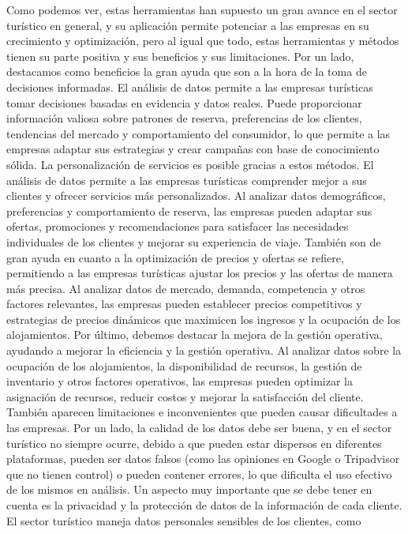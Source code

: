 \documentclass[
  letterpaper,
  DIV=11,
  numbers=noendperiod]{scrreprt}
\begin{document}
Como podemos ver, estas herramientas han supuesto un gran avance en el
sector turístico en general, y su aplicación permite potenciar a las
empresas en su crecimiento y optimización, pero al igual que todo, estas
herramientas y métodos tienen su parte positiva y sus beneficios y sus
limitaciones. Por un lado, destacamos como beneficios la gran ayuda que
son a la hora de la toma de decisiones informadas. El análisis de datos
permite a las empresas turísticas tomar decisiones basadas en evidencia
y datos reales. Puede proporcionar información valiosa sobre patrones de
reserva, preferencias de los clientes, tendencias del mercado y
comportamiento del consumidor, lo que permite a las empresas adaptar sus
estrategias y crear campañas con base de conocimiento sólida. La
personalización de servicios es posible gracias a estos métodos. El
análisis de datos permite a las empresas turísticas comprender mejor a
sus clientes y ofrecer servicios más personalizados. Al analizar datos
demográficos, preferencias y comportamiento de reserva, las empresas
pueden adaptar sus ofertas, promociones y recomendaciones para
satisfacer las necesidades individuales de los clientes y mejorar su
experiencia de viaje. También son de gran ayuda en cuanto a la
optimización de precios y ofertas se refiere, permitiendo a las empresas
turísticas ajustar los precios y las ofertas de manera más precisa. Al
analizar datos de mercado, demanda, competencia y otros factores
relevantes, las empresas pueden establecer precios competitivos y
estrategias de precios dinámicos que maximicen los ingresos y la
ocupación de los alojamientos. Por último, debemos destacar la mejora de
la gestión operativa, ayudando a mejorar la eficiencia y la gestión
operativa. Al analizar datos sobre la ocupación de los alojamientos, la
disponibilidad de recursos, la gestión de inventario y otros factores
operativos, las empresas pueden optimizar la asignación de recursos,
reducir costos y mejorar la satisfacción del cliente. También aparecen
limitaciones e inconvenientes que pueden causar dificultades a las
empresas. Por un lado, la calidad de los datos debe ser buena, y en el
sector turístico no siempre ocurre, debido a que pueden estar dispersos
en diferentes plataformas, pueden ser datos falsos (como las opiniones
en Google o Tripadvisor que no tienen control) o pueden contener
errores, lo que dificulta el uso efectivo de los mismos en análisis. Un
aspecto muy importante que se debe tener en cuenta es la privacidad y la
protección de datos de la información de cada cliente. El sector
turístico maneja datos personales sensibles de los clientes, como
\end{document}
